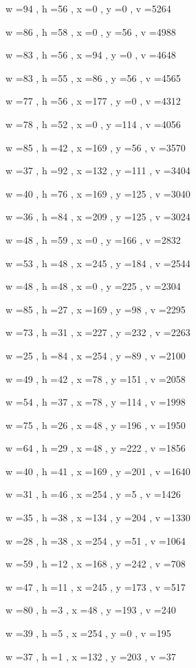\documentclass[11pt]{article}
\begin{document}
w =94 , h =56 , x =0 , y =0 , v =5264
\par
w =86 , h =58 , x =0 , y =56 , v =4988
\par
w =83 , h =56 , x =94 , y =0 , v =4648
\par
w =83 , h =55 , x =86 , y =56 , v =4565
\par
w =77 , h =56 , x =177 , y =0 , v =4312
\par
w =78 , h =52 , x =0 , y =114 , v =4056
\par
w =85 , h =42 , x =169 , y =56 , v =3570
\par
w =37 , h =92 , x =132 , y =111 , v =3404
\par
w =40 , h =76 , x =169 , y =125 , v =3040
\par
w =36 , h =84 , x =209 , y =125 , v =3024
\par
w =48 , h =59 , x =0 , y =166 , v =2832
\par
w =53 , h =48 , x =245 , y =184 , v =2544
\par
w =48 , h =48 , x =0 , y =225 , v =2304
\par
w =85 , h =27 , x =169 , y =98 , v =2295
\par
w =73 , h =31 , x =227 , y =232 , v =2263
\par
w =25 , h =84 , x =254 , y =89 , v =2100
\par
w =49 , h =42 , x =78 , y =151 , v =2058
\par
w =54 , h =37 , x =78 , y =114 , v =1998
\par
w =75 , h =26 , x =48 , y =196 , v =1950
\par
w =64 , h =29 , x =48 , y =222 , v =1856
\par
w =40 , h =41 , x =169 , y =201 , v =1640
\par
w =31 , h =46 , x =254 , y =5 , v =1426
\par
w =35 , h =38 , x =134 , y =204 , v =1330
\par
w =28 , h =38 , x =254 , y =51 , v =1064
\par
w =59 , h =12 , x =168 , y =242 , v =708
\par
w =47 , h =11 , x =245 , y =173 , v =517
\par
w =80 , h =3 , x =48 , y =193 , v =240
\par
w =39 , h =5 , x =254 , y =0 , v =195
\par
w =37 , h =1 , x =132 , y =203 , v =37
\par
\newpage
\end{document}
